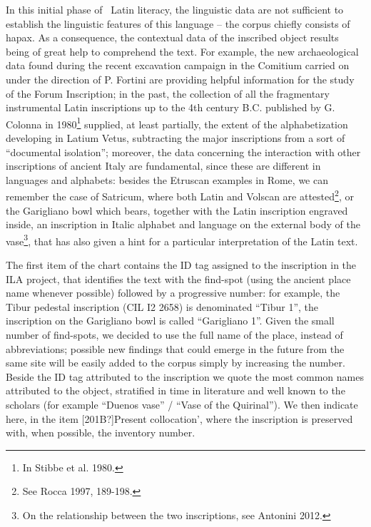 \documentclass[amsthm,ebook]{saparticle}
\begin{document}
In this initial phase of \ Latin literacy, the linguistic data are not sufficient to establish the linguistic features
of this language – the corpus chiefly consists of hapax. As a consequence, the contextual data of the inscribed object
results being of great help to comprehend the text. For example, the new archaeological data found during the recent
excavation campaign in the Comitium carried on under the direction of P. Fortini are providing helpful information for
the study of the Forum Inscription; in the past, the collection of all the fragmentary instrumental Latin inscriptions
up to the 4th century B.C. published by G. Colonna in 1980\footnote{In Stibbe et al. 1980.} supplied, at least
partially, the extent of the alphabetization developing in Latium Vetus, subtracting the major inscriptions from a sort
of “documental isolation”; moreover, the data concerning the interaction with other inscriptions of ancient Italy are
fundamental, since these are different in languages and alphabets: besides the Etruscan examples in Rome, we can
remember the case of Satricum, where both Latin and Volscan are attested\footnote{See Rocca 1997, 189-198.}, or the
Garigliano bowl which bears, together with the Latin inscription engraved inside, an inscription in Italic alphabet and
language on the external body of the vase\footnote{On the relationship between the two inscriptions, see Antonini
2012.}, that has also given a hint for a particular interpretation of the Latin text. 

The first item of the chart contains the ID tag assigned to the inscription in the ILA project, that identifies the text
with the find-spot (using the ancient place name whenever possible) followed by a progressive number: for example, the
Tibur pedestal inscription (CIL I2 2658) is denominated “Tibur 1”, the inscription on the Garigliano bowl is called
“Garigliano 1”. Given the small number of find-spots, we decided to use the full name of the place, instead of
abbreviations; possible new findings that could emerge in the future from the same site will be easily added to the
corpus simply by increasing the number. Beside the ID tag attributed to the inscription we quote the most common names
attributed to the object, stratified in time in literature and well known to the scholars (for example “Duenos vase” /
“Vase of the Quirinal”). We then indicate here, in the item [201B?]Present collocation’, where the inscription is
preserved with, when possible, the inventory number.
\end{document}
